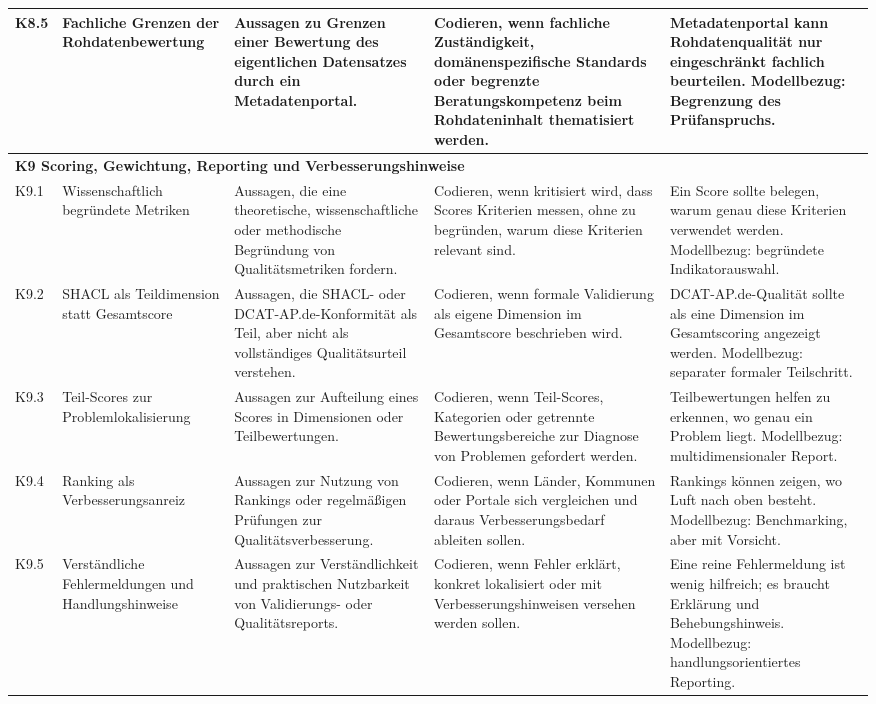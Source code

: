 \begin{longtable}{p{1cm} p{2.5cm} p{3.2cm} p{4.5cm} p{4.5cm}}
K8.5 & Fachliche Grenzen der Rohdatenbewertung
& Aussagen zu Grenzen einer Bewertung des eigentlichen Datensatzes durch ein Metadatenportal.
& Codieren, wenn fachliche Zuständigkeit, domänenspezifische Standards oder begrenzte Beratungskompetenz beim Rohdateninhalt thematisiert werden.
& Metadatenportal kann Rohdatenqualität nur eingeschränkt fachlich beurteilen. Modellbezug: Begrenzung des Prüfanspruchs. \\

\midrule
\multicolumn{5}{l}{\textbf{K9 Scoring, Gewichtung, Reporting und Verbesserungshinweise}} \\
\midrule

K9.1 & Wissenschaftlich begründete Metriken
& Aussagen, die eine theoretische, wissenschaftliche oder methodische Begründung von Qualitätsmetriken fordern.
& Codieren, wenn kritisiert wird, dass Scores Kriterien messen, ohne zu begründen, warum diese Kriterien relevant sind.
& Ein Score sollte belegen, warum genau diese Kriterien verwendet werden. Modellbezug: begründete Indikatorauswahl. \\

K9.2 & SHACL als Teildimension statt Gesamtscore
& Aussagen, die SHACL- oder DCAT-AP.de-Konformität als Teil, aber nicht als vollständiges Qualitätsurteil verstehen.
& Codieren, wenn formale Validierung als eigene Dimension im Gesamtscore beschrieben wird.
& DCAT-AP.de-Qualität sollte als eine Dimension im Gesamtscoring angezeigt werden. Modellbezug: separater formaler Teilschritt. \\

K9.3 & Teil-Scores zur Problemlokalisierung
& Aussagen zur Aufteilung eines Scores in Dimensionen oder Teilbewertungen.
& Codieren, wenn Teil-Scores, Kategorien oder getrennte Bewertungsbereiche zur Diagnose von Problemen gefordert werden.
& Teilbewertungen helfen zu erkennen, wo genau ein Problem liegt. Modellbezug: multidimensionaler Report. \\

K9.4 & Ranking als Verbesserungsanreiz
& Aussagen zur Nutzung von Rankings oder regelmäßigen Prüfungen zur Qualitätsverbesserung.
& Codieren, wenn Länder, Kommunen oder Portale sich vergleichen und daraus Verbesserungsbedarf ableiten sollen.
& Rankings können zeigen, wo Luft nach oben besteht. Modellbezug: Benchmarking, aber mit Vorsicht. \\

K9.5 & Verständliche Fehlermeldungen und Handlungshinweise
& Aussagen zur Verständlichkeit und praktischen Nutzbarkeit von Validierungs- oder Qualitätsreports.
& Codieren, wenn Fehler erklärt, konkret lokalisiert oder mit Verbesserungshinweisen versehen werden sollen.
& Eine reine Fehlermeldung ist wenig hilfreich; es braucht Erklärung und Behebungshinweis. Modellbezug: handlungsorientiertes Reporting. \\


\end{longtable}
